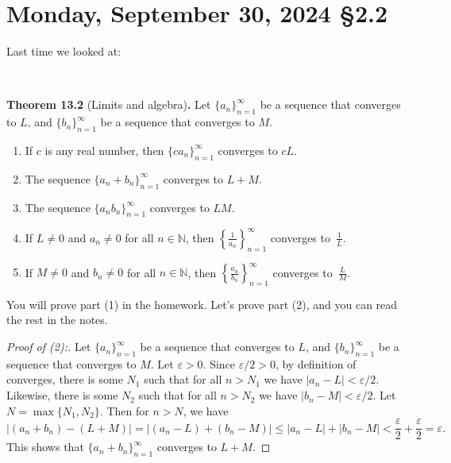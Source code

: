 \documentclass[12pt]{amsart}
\def\Mo{Monday}
\def\e{\varepsilon}
\newcommand{\N}{\mathbb{N}}
\numberwithin{equation}{section}
\theoremstyle{plain} %
\newcommand{\Sept}[3]{\section{#2, September #1, 2024 \quad \S#3}}
\theoremstyle{definition}
\theoremstyle{remark}
\begin{document}
\Sept{30}{\Mo}{2.2}

Last time we looked at:

\


\noindent \textbf{Theorem 13.2} (Limits and algebra)\textbf{.}
Let $\{a_n\}_{n=1}^\infty$ be a sequence that converges to $L$, and $\{b_n\}_{n=1}^\infty$ be a sequence that converges to $M$.
\begin{enumerate}
\item If $c$ is any real number, then $\{ c a_n\}_{n=1}^\infty$ converges to $cL$.
\item The sequence $\{a_n + b_n\}_{n=1}^\infty$ converges to $L+M$.
\item The sequence $\{a_n b_n\}_{n=1}^\infty$ converges to $LM$.
\item If $L\neq 0$ and $a_n\neq 0$ for all $n\in \N$, then $\displaystyle\left\{\frac{1}{a_n}\right\}_{n=1}^\infty$\!\!\! converges to~$\displaystyle \frac{1}{L}$.
\item If $M\neq 0$ and $b_n\neq 0$ for all $n\in \N$, then $\displaystyle\left\{\frac{a_n}{b_n}\right\}_{n=1}^\infty$\!\!\! converges to~$\displaystyle \frac{L}{M}$.
\end{enumerate}

You will prove part (1) in the homework. Let's prove part (2), and you can read the rest in the notes.

\begin{proof}[Proof of (2):] 
Let $\{a_n\}_{n=1}^\infty$ be a sequence that converges to $L$, and $\{b_n\}_{n=1}^\infty$ be a sequence that converges to $M$. Let $\e>0$. Since $\e/2>0$, by definition of converges, there is some $N_1$ such that for all $n>N_1$ we have $|a_n-L|<\e/2$. Likewise, there is some $N_2$ such that for all $n>N_2$ we have $|b_n-M|<\e/2$. Let $N=\max\{N_1,N_2\}$. Then for $n>N$, we have
\[ |(a_n + b_n) - (L+M) | = |(a_n -L) + (b_n-M) | \leq  |a_n -L| + |b_n-M | < \frac{\e}{2} + \frac{\e}{2} = \e.\]
This shows that $\{a_n + b_n\}_{n=1}^\infty$ converges to $L+M$.
\end{proof}
\end{document}
